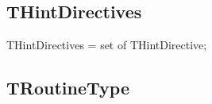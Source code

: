 \documentclass{report}
\newif\ifpdf
\begin{document}
\subsection*{THintDirectives}
\fi
\label{PasDoc_Items-THintDirectives}
\begin{list}{}{
\setlength{\itemindent}{0cm}
\setlength{\listparindent}{0cm}
\setlength{\leftmargin}{\evensidemargin}
\addtolength{\leftmargin}{\tmplength}
\settowidth{\labelsep}{X}
\addtolength{\leftmargin}{\labelsep}
\setlength{\labelwidth}{\tmplength}
}
\item[\textbf{Declaration}\hfill]
\ifpdf
\begin{flushleft}
\fi
\begin{ttfamily}
THintDirectives = set of THintDirective;\end{ttfamily}

\ifpdf
\end{flushleft}
\fi

\end{list}
\ifpdf
\subsection*{\large{\textbf{TRoutineType}}\normalsize\hspace{1ex}\hrulefill}
\else
\end{document}
